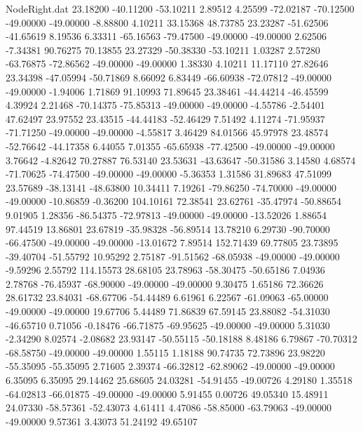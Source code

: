 \begin{filecontents}{NodeRight.dat}
  23.18200  -40.11200  -53.10211     2.89512    4.25599  -72.02187  -70.12500  -49.00000  -49.00000   -8.88800    4.10211   33.15368   48.73785
  23.23287  -51.62506  -41.65619     8.19536    6.33311  -65.16563  -79.47500  -49.00000  -49.00000    2.62506   -7.34381   90.76275   70.13855
  23.27329  -50.38330  -53.10211     1.03287    2.57280  -63.76875  -72.86562  -49.00000  -49.00000    1.38330    4.10211   11.17110   27.82646
  23.34398  -47.05994  -50.71869     8.66092    6.83449  -66.60938  -72.07812  -49.00000  -49.00000   -1.94006    1.71869   91.10993   71.89645
  23.38461  -44.44214  -46.45599     4.39924    2.21468  -70.14375  -75.85313  -49.00000  -49.00000   -4.55786   -2.54401   47.62497   23.97552
  23.43515  -44.44183  -52.46429     7.51492    4.11274  -71.95937  -71.71250  -49.00000  -49.00000   -4.55817    3.46429   84.01566   45.97978
  23.48574  -52.76642  -44.17358     6.44055    7.01355  -65.65938  -77.42500  -49.00000  -49.00000    3.76642   -4.82642   70.27887   76.53140
  23.53631  -43.63647  -50.31586     3.14580    4.68574  -71.70625  -74.47500  -49.00000  -49.00000   -5.36353    1.31586   31.89683   47.51099
  23.57689  -38.13141  -48.63800    10.34411    7.19261  -79.86250  -74.70000  -49.00000  -49.00000  -10.86859   -0.36200  104.10161   72.38541
  23.62761  -35.47974  -50.88654     9.01905    1.28356  -86.54375  -72.97813  -49.00000  -49.00000  -13.52026    1.88654   97.44519   13.86801
  23.67819  -35.98328  -56.89514    13.78210    6.29730  -90.70000  -66.47500  -49.00000  -49.00000  -13.01672    7.89514  152.71439   69.77805
  23.73895  -39.40704  -51.55792    10.95292    2.75187  -91.51562  -68.05938  -49.00000  -49.00000   -9.59296    2.55792  114.15573   28.68105
  23.78963  -58.30475  -50.65186     7.04936    2.78768  -76.45937  -68.90000  -49.00000  -49.00000    9.30475    1.65186   72.36626   28.61732
  23.84031  -68.67706  -54.44489     6.61961    6.22567  -61.09063  -65.00000  -49.00000  -49.00000   19.67706    5.44489   71.86839   67.59145
  23.88082  -54.31030  -46.65710     0.71056   -0.18476  -66.71875  -69.95625  -49.00000  -49.00000    5.31030   -2.34290    8.02574   -2.08682
  23.93147  -50.55115  -50.18188     8.48186    6.79867  -70.70312  -68.58750  -49.00000  -49.00000    1.55115    1.18188   90.74735   72.73896
  23.98220  -55.35095  -55.35095     2.71605    2.39374  -66.32812  -62.89062  -49.00000  -49.00000    6.35095    6.35095   29.14462   25.68605
  24.03281  -54.91455  -49.00726     4.29180    1.35518  -64.02813  -66.01875  -49.00000  -49.00000    5.91455    0.00726   49.05340   15.48911
  24.07330  -58.57361  -52.43073     4.61411    4.47086  -58.85000  -63.79063  -49.00000  -49.00000    9.57361    3.43073   51.24192   49.65107

\end{filecontents}
